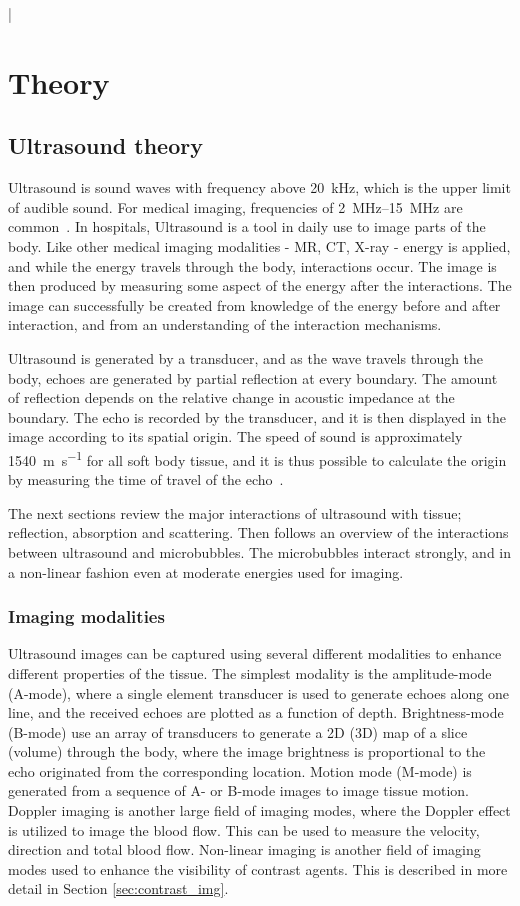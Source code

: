 |%
\section{Theory}
\subsection{Ultrasound theory}
Ultrasound is sound waves with frequency above \SI{20}{\kilo\hertz}, which is the upper limit of audible sound. For medical imaging, frequencies of \SIrange{2}{15}{\mega\hertz} are common~\cite{Hoskins2010}. In hospitals, Ultrasound is a tool in daily use to image parts of the body. Like other medical imaging modalities - MR, CT, X-ray - energy is applied, and while the energy travels through the body, interactions occur. The image is then produced by measuring some aspect of the energy after the interactions. The image can successfully be created from knowledge of the energy before and after interaction, and from an understanding of the interaction mechanisms.

Ultrasound is generated by a transducer, and as the wave travels through the body, echoes are generated by partial reflection at every boundary. The amount of reflection depends on the relative change in acoustic impedance at the boundary. The echo is recorded by the transducer, and it is then displayed in the image according to its spatial origin. The speed of sound is approximately \SI{1540}{\metre\per\second} for all soft body tissue, and it is thus possible to calculate the origin by measuring the time of travel of the echo~\cite{Flower2012}. 

The next sections review the major interactions of ultrasound with tissue; reflection, absorption and scattering. Then follows an overview of the interactions between ultrasound and microbubbles. The microbubbles interact strongly, and in a non-linear fashion even at moderate energies used for imaging.

\subsubsection{Imaging modalities}
Ultrasound images can be captured using several different modalities to enhance different properties of the tissue. The simplest modality is the amplitude-mode (A-mode), where a single element transducer is used to generate echoes along one line, and the received echoes are plotted as a function of depth. Brightness-mode (B-mode) use an array of transducers to generate a 2D (3D) map of a slice (volume) through the body, where the image brightness is proportional to the echo originated from the corresponding location. Motion mode (M-mode) is generated from a sequence of A- or B-mode images to image tissue motion. Doppler imaging is another large field of imaging modes, where the Doppler effect is utilized to image the blood flow. This can be used to measure the velocity, direction and total blood flow. Non-linear imaging is another field of imaging modes used to enhance the visibility of contrast agents. This is described in more detail in Section \ref{sec:contrast_img}.

